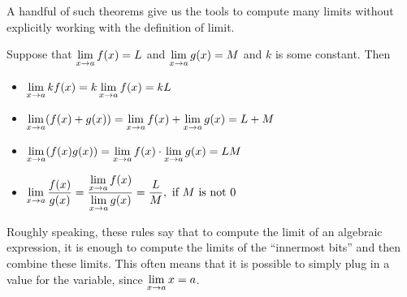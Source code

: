 A handful of such theorems give us the tools to compute many limits
without explicitly working with the definition of limit.

\begin{mainTheorem} Suppose that $\displaystyle \lim_{x\to a}f(x)=L$ and $\displaystyle \lim_{x\to a}g(x)=M$ and
$k$ is some constant. Then
\begin{itemize}
\item $\displaystyle\lim_{x\to a} kf(x) = k\lim_{x\to a}f(x)=kL$ 
\item $\displaystyle\lim_{x\to a} (f(x)+g(x)) = \lim_{x\to a}f(x)+\lim_{x\to a}g(x)=L+M$  
\item $\displaystyle\lim_{x\to a} (f(x)g(x)) = \lim_{x\to a}f(x)\cdot\lim_{x\to a}g(x)=LM$ 
\item $\displaystyle\lim_{x\to a} \frac{f(x)}{g(x)} = \frac{\displaystyle\lim_{x\to a}f(x)}{\displaystyle\lim_{x\to
    a}g(x)}=\frac{L}{M},\text{ if $M$ is not 0}$
\end{itemize}
\label{thm:limit laws}
\end{mainTheorem}

Roughly speaking, these rules say that to compute the limit of an
algebraic expression, it is enough to compute the limits of the
``innermost bits'' and then combine these limits. This often means
that it is possible to simply plug in a value for the variable, since
$\displaystyle \lim_{x\to a} x =a$.
